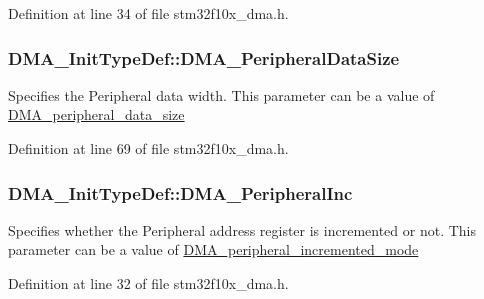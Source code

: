 Definition at line 34 of file stm32f10x\+\_\+dma.\+h.

\subsubsection[{\texorpdfstring{D\+M\+A\+\_\+\+Peripheral\+Data\+Size}{DMA_PeripheralDataSize}}]{ D\+M\+A\+\_\+\+Init\+Type\+Def\+::\+D\+M\+A\+\_\+\+Peripheral\+Data\+Size}\hypertarget{struct_d_m_a___init_type_def_afb46aaadfb80a7e19277c868bd252554}{}\label{struct_d_m_a___init_type_def_afb46aaadfb80a7e19277c868bd252554}
Specifies the Peripheral data width. This parameter can be a value of \hyperlink{group___d_m_a__peripheral__data__size}{D\+M\+A\+\_\+peripheral\+\_\+data\+\_\+size} 

Definition at line 69 of file stm32f10x\+\_\+dma.\+h.

\subsubsection[{\texorpdfstring{D\+M\+A\+\_\+\+Peripheral\+Inc}{DMA_PeripheralInc}}]{ D\+M\+A\+\_\+\+Init\+Type\+Def\+::\+D\+M\+A\+\_\+\+Peripheral\+Inc}\hypertarget{struct_d_m_a___init_type_def_a5da3ba0fe5ae5560cef992c86c129376}{}\label{struct_d_m_a___init_type_def_a5da3ba0fe5ae5560cef992c86c129376}
Specifies whether the Peripheral address register is incremented or not. This parameter can be a value of \hyperlink{group___d_m_a__peripheral__incremented__mode}{D\+M\+A\+\_\+peripheral\+\_\+incremented\+\_\+mode} 

Definition at line 32 of file stm32f10x\+\_\+dma.\+h.

